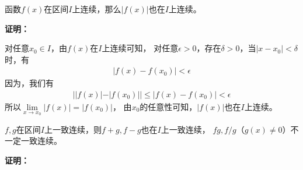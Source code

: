 \documentclass{article}
\begin{document}
\begin{zremark}
  函数$f(x)$在区间$I$上连续，那么$|f(x)|$也在$I$上连续。
\end{zremark}

\textbf{证明：}

对任意$x_0 \in I$，由$f(x)$在$I$上连续可知，
对任意$\epsilon > 0$，存在$\delta > 0$，当$|x - x_0| < \delta$时，有
\begin{align*}
  |f(x) - f(x_0)| < \epsilon
\end{align*}
因为，我们有
\begin{align*}
  | |f(x)| - |f(x_0)| | \leq |f(x) - f(x_0)| < \epsilon
\end{align*}
所以$\lim\limits_{x \to x_0} |f(x)| = |f(x_0)|$，
由$x_0$的任意性可知，$|f(x)|$也在$I$上连续。

\begin{zremark}
  $f, g$在区间$I$上一致连续，则$f + g, f - g$也在$I$上一致连续，
  $f g, f / g$（$g(x) \neq 0$）不一定一致连续。
\end{zremark}

\textbf{证明：}
\end{document}
